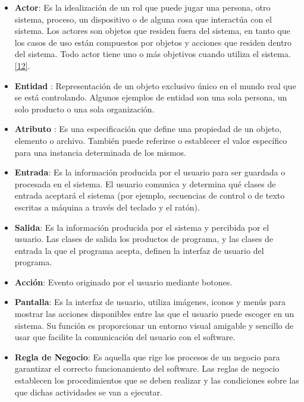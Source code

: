 \begin{itemize}
\item \textbf{Actor}: Es la idealización de un rol que puede jugar una persona, otro sistema, proceso, un dispositivo o de alguna cosa que interactúa con el sistema. Los actores son objetos que residen fuera del sistema, en tanto que los casos de uso están compuestos por objetos y acciones que residen dentro del sistema. Todo actor tiene uno o más objetivos cuando utiliza el sistema.  \hyperlink{b12}{[12]}. 

\item \textbf{Entidad} : Representación de un objeto exclusivo único en el mundo real que se está controlando. Algunos ejemplos de entidad son una sola persona, un solo producto o una sola organización. 

\item \textbf{Atributo} : Es una especificación que define una propiedad de un objeto, elemento o archivo. También puede referirse o establecer el valor específico para una instancia determinada de los mismos.

\item \textbf{Entrada}: Es la información producida por el usuario para ser guardada o procesada en el sistema. El usuario comunica y determina qué clases de entrada aceptará el sistema (por ejemplo, secuencias de control o de texto escritas a máquina a través del teclado y el ratón).

\item \textbf{Salida}: Es la información producida por el sistema y percibida por el usuario. Las clases de salida los productos de programa, y las clases de entrada la que el programa acepta, definen la interfaz de usuario del programa.

\item \textbf{Acción}: Evento originado por el usuario mediante botones.

\item \textbf{Pantalla}: Es la interfaz de usuario, utiliza imágenes, iconos y menús para mostrar las acciones disponibles entre las que el usuario puede escoger en un sistema. Su función es proporcionar un entorno visual amigable y sencillo de usar que facilite la comunicación del usuario con el software.

\item \textbf{Regla de Negocio}: Es aquella que rige los procesos de un negocio para garantizar el correcto funcionamiento del software. Las reglas de negocio establecen los procedimientos que se deben realizar y las condiciones sobre las que dichas actividades se van a ejecutar.


\end{itemize}
